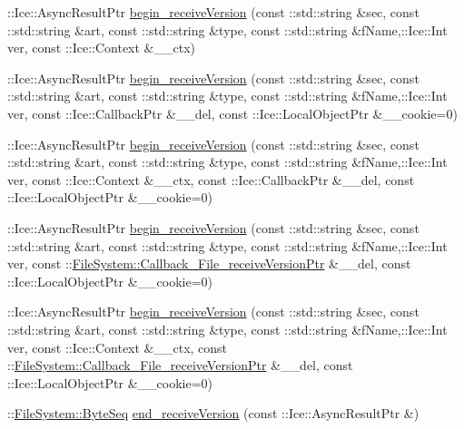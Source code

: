 \begin{DoxyCompactItemize}
\item 
\+::Ice\+::\+Async\+Result\+Ptr \hyperlink{class_ice_proxy_1_1_file_system_1_1_file_ac031ccd296c05c2fa3d35ffb5bd5567a}{begin\+\_\+receive\+Version} (const \+::std\+::string \&sec, const \+::std\+::string \&art, const \+::std\+::string \&type, const \+::std\+::string \&f\+Name,\+::Ice\+::\+Int ver, const \+::Ice\+::\+Context \&\+\_\+\+\_\+ctx)
\item 
\+::Ice\+::\+Async\+Result\+Ptr \hyperlink{class_ice_proxy_1_1_file_system_1_1_file_a018221725b3a59eece1dc97ae731ebe3}{begin\+\_\+receive\+Version} (const \+::std\+::string \&sec, const \+::std\+::string \&art, const \+::std\+::string \&type, const \+::std\+::string \&f\+Name,\+::Ice\+::\+Int ver, const \+::Ice\+::\+Callback\+Ptr \&\+\_\+\+\_\+del, const \+::Ice\+::\+Local\+Object\+Ptr \&\+\_\+\+\_\+cookie=0)
\item 
\+::Ice\+::\+Async\+Result\+Ptr \hyperlink{class_ice_proxy_1_1_file_system_1_1_file_aa6b45e4cae6983ae197b639d7bd46b56}{begin\+\_\+receive\+Version} (const \+::std\+::string \&sec, const \+::std\+::string \&art, const \+::std\+::string \&type, const \+::std\+::string \&f\+Name,\+::Ice\+::\+Int ver, const \+::Ice\+::\+Context \&\+\_\+\+\_\+ctx, const \+::Ice\+::\+Callback\+Ptr \&\+\_\+\+\_\+del, const \+::Ice\+::\+Local\+Object\+Ptr \&\+\_\+\+\_\+cookie=0)
\item 
\+::Ice\+::\+Async\+Result\+Ptr \hyperlink{class_ice_proxy_1_1_file_system_1_1_file_a27ec313b8e57803b7659963738ad2946}{begin\+\_\+receive\+Version} (const \+::std\+::string \&sec, const \+::std\+::string \&art, const \+::std\+::string \&type, const \+::std\+::string \&f\+Name,\+::Ice\+::\+Int ver, const \+::\hyperlink{namespace_file_system_a9f139d463637347415d1d3dadefe9bad}{File\+System\+::\+Callback\+\_\+\+File\+\_\+receive\+Version\+Ptr} \&\+\_\+\+\_\+del, const \+::Ice\+::\+Local\+Object\+Ptr \&\+\_\+\+\_\+cookie=0)
\item 
\+::Ice\+::\+Async\+Result\+Ptr \hyperlink{class_ice_proxy_1_1_file_system_1_1_file_a160bd20bd4efbbcc3ba9644d072110bd}{begin\+\_\+receive\+Version} (const \+::std\+::string \&sec, const \+::std\+::string \&art, const \+::std\+::string \&type, const \+::std\+::string \&f\+Name,\+::Ice\+::\+Int ver, const \+::Ice\+::\+Context \&\+\_\+\+\_\+ctx, const \+::\hyperlink{namespace_file_system_a9f139d463637347415d1d3dadefe9bad}{File\+System\+::\+Callback\+\_\+\+File\+\_\+receive\+Version\+Ptr} \&\+\_\+\+\_\+del, const \+::Ice\+::\+Local\+Object\+Ptr \&\+\_\+\+\_\+cookie=0)
\item 
\+::\hyperlink{namespace_file_system_a5c85de065f9c451ae1d1dea2dacb68c5}{File\+System\+::\+Byte\+Seq} \hyperlink{class_ice_proxy_1_1_file_system_1_1_file_ab70bdc2bd55ab5af5c6c526e20b6073d}{end\+\_\+receive\+Version} (const \+::Ice\+::\+Async\+Result\+Ptr \&)

\end{DoxyCompactItemize}
